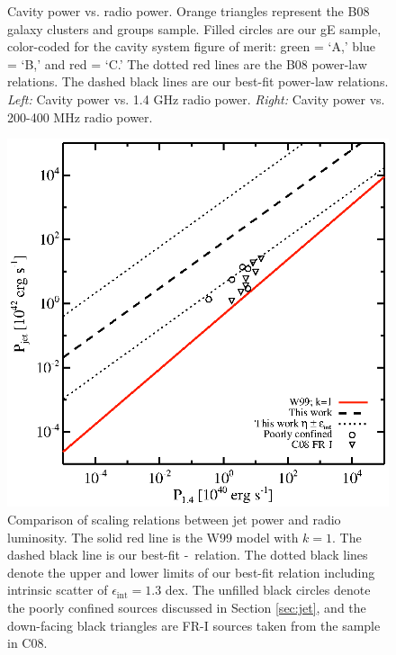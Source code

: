\begin{center}
\begin{figure}[ht]
\begin{minipage}[ht]{0.5\linewidth}
    \end{minipage}
    \caption{Cavity power vs. radio power. Orange triangles represent
      the B08 galaxy clusters and groups sample. Filled circles are
      our gE sample, color-coded for the cavity system figure of
      merit: green = `A,' blue = `B,' and red = `C.' The dotted red
      lines are the B08 power-law relations. The dashed black lines
      are our best-fit power-law relations. {\it{Left:}} Cavity power
      vs. 1.4 GHz radio power. {\it{Right:}} Cavity power vs. 200-400
      MHz radio power.}
    \label{fig:pcav}
  \end{figure}
\end{center}

\begin{figure}[ht]
  \begin{center}
    \begin{minipage}[ht]{0.5\linewidth}
      \includegraphics*[width=\textwidth, trim=30mm 5mm 40mm 15mm, clip]{radeff.eps}
      \caption{Comparison of scaling relations between jet power and
        radio luminosity. The solid red line is the W99 model with
        $k=1$. The dashed black line is our best-fit
        \pjet-\phigh\ relation. The dotted black lines denote the
        upper and lower limits of our best-fit relation including
        intrinsic scatter of $\epsilon_{\mathrm{int}} = 1.3$ dex. The
        unfilled black circles denote the poorly confined sources
        discussed in Section \ref{sec:jet}, and the down-facing black
        triangles are FR-I sources taken from the sample in C08.}
      \label{fig:radeff}
    \end{minipage}
  \end{center}
\end{figure}

